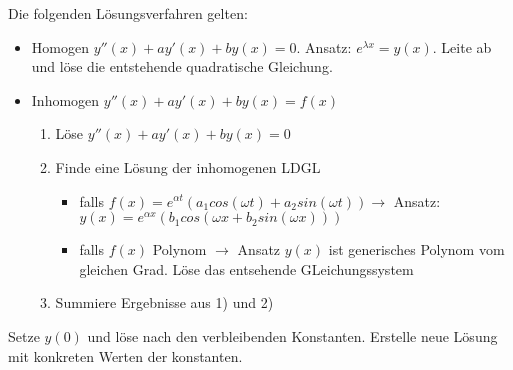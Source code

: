 \begin{definition}
	Die folgenden Lösungsverfahren gelten:
	
	\begin{itemize}
		\item Homogen $y''(x) + a y'(x) + b y(x) = 0$. Ansatz: $e^{\lambda x} = y(x)$. Leite ab und löse die entstehende quadratische Gleichung.
		\item Inhomogen $y''(x) + a y'(x) + b y(x) = f(x) $
		\begin{enumerate} [noitemsep]
			\item Löse $y''(x) + a y'(x) + b y(x) = 0$
			\item Finde eine Lösung der inhomogenen LDGL 
			\begin{itemize}
				\item falls $f(x) = e^{\alpha t} (a_1 cos(\omega t) + a_2 sin(\omega t)) \rightarrow $ Ansatz: $y(x) = e^{\alpha x} (b_1 cos(\omega x + b_2 sin(\omega x)))$
				\item falls $f(x)$ Polynom $\rightarrow$ Ansatz $y(x)$ ist generisches Polynom vom gleichen Grad. Löse das entsehende GLeichungssystem
			\end{itemize}
			\item Summiere Ergebnisse aus 1) und 2)
		\end{enumerate}
	\end{itemize}
\end{definition}

\begin{definition}[Anfangswertproblem]
	Setze $y(0)$ und löse nach den verbleibenden Konstanten. Erstelle neue Lösung mit konkreten Werten der konstanten.
\end{definition}

\pagebreak


